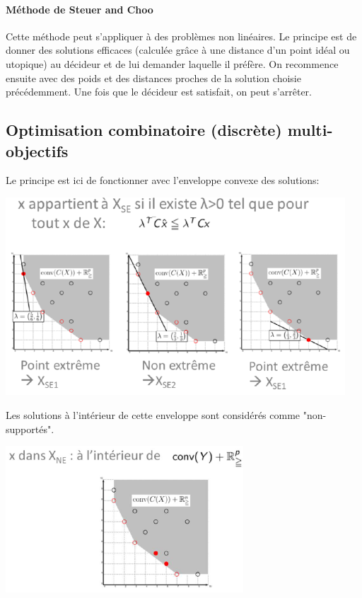 \documentclass[a4paper, 12pt]{article}
\newcommand{\alinea}{
\hspace*{0.5cm}}
\begin{document}
		\paragraph{Méthode de Steuer and Choo} Cette méthode peut s'appliquer à des problèmes non linéaires. Le principe
			est de donner des solutions efficaces (calculée grâce à une distance d'un point idéal ou utopique) au décideur et de lui
			demander laquelle il préfère. On recommence ensuite avec des poids et des distances proches de la solution choisie 
			précédemment. Une fois que le décideur est satisfait, on peut s'arrêter.
	\pagebreak
	\subsection{Optimisation combinatoire (discrète) multi-objectifs}
		\alinea Le principe est ici de fonctionner avec l'enveloppe convexe des solutions: 
			\begin{center}
				\includegraphics[width=5in]{Images/combinatoire}
			\end{center}
		\alinea Les solutions à l'intérieur de cette enveloppe sont considérés comme "non-supportés".
		\begin{center}
			\includegraphics[width=3.5in]{Images/combinatoire2}
		\end{center}
%
\pagebreak
%
\end{document}

